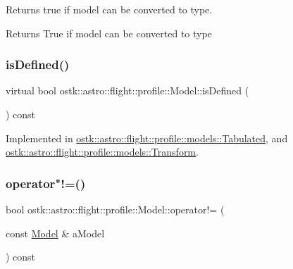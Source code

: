 Returns true if model can be converted to type. 

\begin{DoxyReturn}{Returns}
True if model can be converted to type 
\end{DoxyReturn}
\mbox{\label{classostk_1_1astro_1_1flight_1_1profile_1_1_model_a0af64ad25ed8d8b2510a70bfe5bcb971}} 
\subsubsection{\texorpdfstring{is\+Defined()}{isDefined()}}
{\footnotesize\ttfamily virtual bool ostk\+::astro\+::flight\+::profile\+::\+Model\+::is\+Defined (\begin{DoxyParamCaption}{ }\end{DoxyParamCaption}) const\hspace{0.3cm}{\ttfamily [pure virtual]}}



Implemented in \hyperlink{classostk_1_1astro_1_1flight_1_1profile_1_1models_1_1_tabulated_ad830d557475ca2ba83d43659e348b1d6}{ostk\+::astro\+::flight\+::profile\+::models\+::\+Tabulated}, and \hyperlink{classostk_1_1astro_1_1flight_1_1profile_1_1models_1_1_transform_a2d0f1f3cc3f340c5617125bea08a9930}{ostk\+::astro\+::flight\+::profile\+::models\+::\+Transform}.

\mbox{\label{classostk_1_1astro_1_1flight_1_1profile_1_1_model_a66eab26e18de60c179529ba5924b168f}} 
\subsubsection{\texorpdfstring{operator"!=()}{operator!=()}}
{\footnotesize\ttfamily bool ostk\+::astro\+::flight\+::profile\+::\+Model\+::operator!= (\begin{DoxyParamCaption}\item[{const \hyperlink{classostk_1_1astro_1_1flight_1_1profile_1_1_model}{Model} \&}]{a\+Model }\end{DoxyParamCaption}) const\hspace{0.3cm}{\ttfamily [virtual]}}



